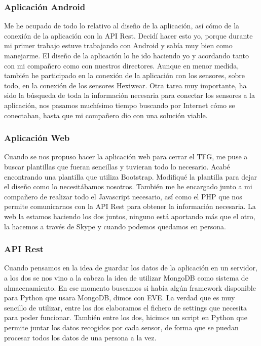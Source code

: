 \subsubsection{Aplicación Android} 
Me he ocupado de todo lo relativo al diseño de la aplicación, así cómo de la conexión de la aplicación con la API Rest. Decidí hacer esto yo, porque durante mi primer trabajo estuve trabajando con Android y sabía muy bien como manejarme. El diseño de la aplicación lo he ido haciendo yo y acordando tanto con mi compañero como con nuestros directores. Aunque en menor medida, también he participado en la conexión de la aplicación con los sensores, sobre todo, en la conexión de los sensores Hexiwear. Otra tarea muy importante, ha sido la búsqueda de toda la información necesaria para conectar los sensores a la aplicación, nos pasamos muchísimo tiempo buscando por Internet cómo se conectaban, hasta que mi compañero dio con una solución viable.
    
\subsubsection{Aplicación Web} 
Cuando se nos propuso hacer la aplicación web para cerrar el TFG, me puse a buscar plantillas que fueran sencillas y tuvieran todo lo necesario. Acabé encontrando una plantilla que utiliza Bootstrap. Modifiqué la plantilla para dejar el diseño como lo necesitábamos nosotros. También me he encargado junto a mi compañero de realizar todo el Javascript necesario, así como el PHP que nos permite comunicarnos con la API Rest para obtener la información necesaria. La web la estamos haciendo los dos juntos, ninguno está aportando más que el otro, la hacemos a través de Skype y cuando podemos quedamos en persona.

\subsubsection{API Rest} 
Cuando pensamos en la idea de guardar los datos de la aplicación en un servidor, a los dos se nos vino a la cabeza la idea de utilizar MongoDB como sistema de almacenamiento. En ese momento buscamos si había algún framework disponible para Python que usara MongoDB, dimos con EVE. La verdad que es muy sencillo de utilizar, entre los dos elaboramos el fichero de settings que necesita para poder funcionar. También entre los dos, hicimos un script en Python que permite juntar los datos recogidos por cada sensor, de forma que se puedan procesar todos los datos de una persona a la vez.

